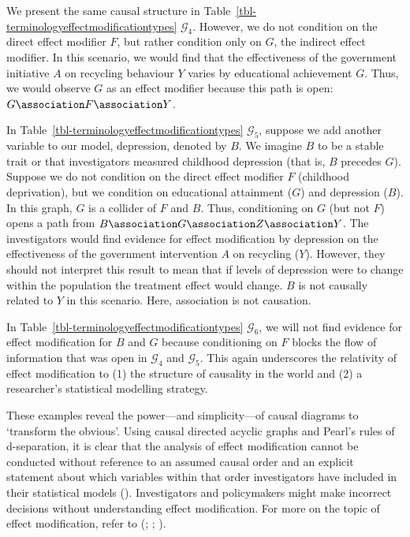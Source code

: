 \documentclass[
  single column]{article}
\begin{document}
We present the same causal structure in
Table~\ref{tbl-terminologyeffectmodificationtypes} \(\mathcal{G}_4\).
However, we do not condition on the direct effect modifier \(F\), but
rather condition only on \(G\), the indirect effect modifier. In this
scenario, we would find that the effectiveness of the government
initiative \(A\) on recycling behaviour \(Y\) varies by educational
achievement \(G\). Thus, we would observe \(G\) as an effect modifier
because this path is open: \(G \association F \association Y\).

In Table~\ref{tbl-terminologyeffectmodificationtypes} \(\mathcal{G}_5\),
suppose we add another variable to our model, depression, denoted by
\(B\). We imagine \(B\) to be a stable trait or that investigators
measured childhood depression (that is, \(B\) precedes \(G\)). Suppose
we do not condition on the direct effect modifier \(F\) (childhood
deprivation), but we condition on educational attainment (\(G\)) and
depression (\(B\)). In this graph, \(G\) is a collider of \(F\) and
\(B\). Thus, conditioning on \(G\) (but not \(F\)) opens a path from
\(B \association G \association Z \association Y\). The investigators
would find evidence for effect modification by depression on the
effectiveness of the government intervention \(A\) on recycling (\(Y\)).
However, they should not interpret this result to mean that if levels of
depression were to change within the population the treatment effect
would change. \(B\) is not causally related to \(Y\) in this scenario.
Here, association is not causation.

In Table~\ref{tbl-terminologyeffectmodificationtypes} \(\mathcal{G}_6\),
we will not find evidence for effect modification for \(B\) and \(G\)
because conditioning on \(F\) blocks the flow of information that was
open in \(\mathcal{G}_4\) and \(\mathcal{G}_5\). This again underscores
the relativity of effect modification to (1) the structure of causality
in the world and (2) a researcher's statistical modelling strategy.

These examples reveal the power---and simplicity---of causal diagrams to
`transform the obvious'. Using causal directed acyclic graphs and
Pearl's rules of d-separation, it is clear that the analysis of effect
modification cannot be conducted without reference to an assumed causal
order and an explicit statement about which variables within that order
investigators have included in their statistical models
(). Investigators and
policymakers might make incorrect decisions without understanding effect
modification. For more on the topic of effect modification, refer to
(;
;
).
\end{document}
